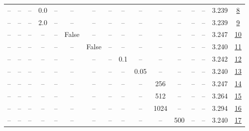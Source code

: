 \begin{table}[H]
\begin{tabular}{cccccccccccccccc}
-- & -- & -- & 0.0 & -- & -- & -- & -- & -- & -- & -- & -- & -- & -- & 3.239 & \href{https://wandb.ai/stanford-mercury/optimizer-scaling/runs/sweep-130m-21B-krondde23clr0.001-wd0.5-b10.95-plr0.2-pis1-gn0.0--a52891}{8} \\
-- & -- & -- & 2.0 & -- & -- & -- & -- & -- & -- & -- & -- & -- & -- & 3.239 & \href{https://wandb.ai/stanford-mercury/optimizer-scaling/runs/sweep-130m-21B-kron1ea0f5lr0.001-wd0.5-b10.95-plr0.2-pis1-gn2.0--d842fd}{9} \\
-- & -- & -- & -- & -- & False & -- & -- & -- & -- & -- & -- & -- & -- & 3.247 & \href{https://wandb.ai/stanford-mercury/optimizer-scaling/runs/sweep-130m-21B-kron655886lr0.001-wd0.5-b10.95-plr0.2-pis1-gn1-no-9fcd23}{10} \\
-- & -- & -- & -- & -- & -- & False & -- & -- & -- & -- & -- & -- & -- & 3.240 & \href{https://wandb.ai/stanford-mercury/optimizer-scaling/runs/sweep-130m-21B-kron3be334lr0.001-wd0.5-b10.95-plr0.2-pis1-gn1-no-189c09}{11} \\
-- & -- & -- & -- & -- & -- & -- & -- & 0.1 & -- & -- & -- & -- & -- & 3.242 & \href{https://wandb.ai/stanford-mercury/optimizer-scaling/runs/sweep-130m-21B-kron2c06b9lr0.001-wd0.5-b10.95-plr0.1-pis1-gn1-no-156c36}{12} \\
-- & -- & -- & -- & -- & -- & -- & -- & -- & 0.05 & -- & -- & -- & -- & 3.240 & \href{https://wandb.ai/stanford-mercury/optimizer-scaling/runs/sweep-130m-21B-kronf63620lr0.001-wd0.5-b10.95-plr0.2-pis1-gn1-no-8d37da}{13} \\
-- & -- & -- & -- & -- & -- & -- & -- & -- & -- & 256 & -- & -- & -- & 3.247 & \href{https://wandb.ai/stanford-mercury/optimizer-scaling/runs/sweep-130m-21B-kronb99966lr0.001-wd0.5-b10.95-plr0.2-pis1-gn1-no-87a643}{14} \\
-- & -- & -- & -- & -- & -- & -- & -- & -- & -- & 512 & -- & -- & -- & 3.264 & \href{https://wandb.ai/stanford-mercury/optimizer-scaling/runs/sweep-130m-21B-kronz798587lr0.001-wd0.5-b10.95-plr0.2-pis1-gn1-n-b546f9}{15} \\
-- & -- & -- & -- & -- & -- & -- & -- & -- & -- & 1024 & -- & -- & -- & 3.294 & \href{https://wandb.ai/stanford-mercury/optimizer-scaling/runs/sweep-130m-21B-kron8f965elr0.001-wd0.5-b10.95-plr0.2-pis1-gn1-no-5a3434}{16} \\
-- & -- & -- & -- & -- & -- & -- & -- & -- & -- & -- & 500 & -- & -- & 3.240 & \href{https://wandb.ai/stanford-mercury/optimizer-scaling/runs/sweep-130m-21B-krona3d4b1lr0.001-wd0.5-b10.95-plr0.2-pis1-gn1-no-734cae}{17} \\

\end{tabular}
\end{table}
